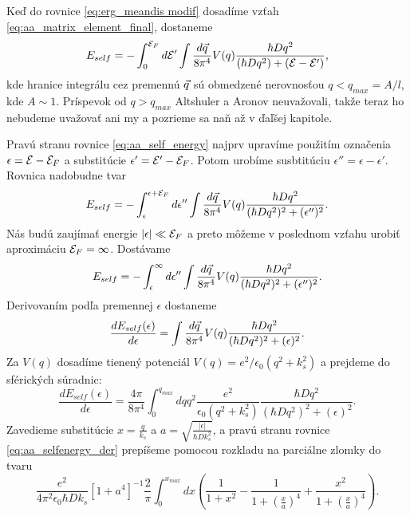 Keď do rovnice \eqref{eq:erg_meandis modif} dosadíme vzťah \eqref{eq:aa_matrix_element_final}, dostaneme
\begin{equation}
 \label{eq:aa_self_energy}
 E_{self}=-\int_{0}^{\mathcal{E}_F}d\mathcal{E}' \int \frac{d\vec{q}}{8\pi^4}V(q)\frac{\hbar D q^2}{(\hbar D q^2)+(\mathcal{E}-\mathcal{E}')}\text{,}
\end{equation}
kde hranice integrálu cez premennú $\vec{q}$ sú obmedzené nerovnosťou $q < q_{max} = A/l$, kde $A \sim 1$. Príspevok od $q > q_{max}$ Altshuler a Aronov neuvažovali, takže teraz ho nebudeme uvažovať ani my
a pozrieme sa naň až v ďaľšej kapitole.

Pravú stranu rovnice \eqref{eq:aa_self_energy} najprv upravíme použitím označenia $\epsilon = \mathcal{E} - \mathcal{E}_F$ a substitúcie $\epsilon'  = \mathcal{E}'  - \mathcal{E}_F$. Potom urobíme susbtitúciu  $\epsilon'' = \epsilon - \epsilon'$.
Rovnica nadobudne tvar
\begin{equation}
\label{eq:aa_selfenergy_subst_2}
E_{self}=-\int_{\epsilon}^{\epsilon+\mathcal{E}_F}d\epsilon'' \int \frac{d\vec{q}}{8\pi^4}V(q)\frac{\hbar D q^2}{(\hbar Dq^2)^2+(\epsilon'')^2}\text{.}
\end{equation}
Nás budú zaujímať energie $|\epsilon| \ll \mathcal{E}_F$ a preto môžeme v poslednom vzťahu urobiť aproximáciu $\mathcal{E}_F=\infty$. Dostávame
\begin{equation}
\label{eq:aa_selfenergy_infinite}
E_{self}=-\int_{\epsilon}^{\infty}d\epsilon'' \int \frac{d\vec{q}}{8\pi^4}V(q)\frac{\hbar D q^2}{(\hbar Dq^2)^2+(\epsilon'')^2}\text{.}
\end{equation}
Derivovaním podľa premennej $\epsilon$ dostaneme
\begin{equation}
 \label{eq:aa_selfenergy_der}
 \frac{dE_{self}(\epsilon)}{d\epsilon}=\int \frac{d\vec{q}}{8\pi^4}V(q)\frac{\hbar D q^2}{(\hbar Dq^2)^2+(\epsilon)^2}\text{.}
\end{equation}
Za $V(q)$ dosadíme tienený potenciál $V(q)=e^2/\epsilon_0(q^2+k_s^2)$ a prejdeme do sférických súradnic:
\begin{equation}
 \frac{dE_{self}(\epsilon)}{d\epsilon}= \frac{4\pi}{8\pi^4} \int_0^{q_{max}} dq q^2 \frac{e^2}{\epsilon_0(q^2+k_s^2)}\frac{\hbar D q^2}{(\hbar Dq^2)^2+(\epsilon)^2} \text{.}
\end{equation}
Zavedieme substitúcie $x=\frac{q}{k_s}$ a $a=\sqrt{\frac{|\epsilon|}{\hbar D k_s^2}}$, a pravú stranu rovnice \eqref{eq:aa_selfenergy_der} prepíšeme pomocou rozkladu na parciálne zlomky do tvaru
\begin{equation}
\label{eq:aa_selfenergy_der_subst1}
\frac{e^2}{4\pi^2 \epsilon_0 \hbar D k_s}\left[1+a^{4}\right]^{-1}\frac{2}{\pi}\int_0^{x_{max}} dx(\frac{1}{1+x^2}-
\frac{1}{1+(\frac{x}{a})^4}+\frac{x^2}{1+(\frac{x}{a})^4})\text{.}
\end{equation}
